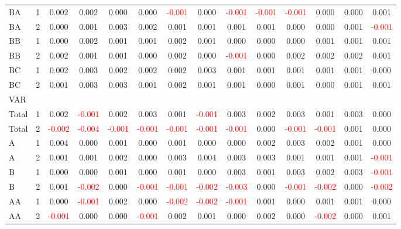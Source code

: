 \begin{table}[H]
{\begin{tabular}{llcccccccccccc}
BA & 1 & 0.002 & 0.002 & 0.000 & 0.000 & \textcolor{red}{-0.001} & 0.000 & \textcolor{red}{-0.001} & \textcolor{red}{-0.001} & \textcolor{red}{-0.001} & 0.000 & 0.000 & 0.001\\
BA & 2 & 0.000 & 0.001 & 0.003 & 0.002 & 0.001 & 0.001 & 0.001 & 0.001 & 0.000 & 0.000 & 0.001 & \textcolor{red}{-0.001}\\
BB & 1 & 0.000 & 0.002 & 0.001 & 0.001 & 0.002 & 0.001 & 0.000 & 0.000 & 0.000 & 0.001 & 0.001 & 0.001\\
BB & 2 & 0.002 & 0.001 & 0.001 & 0.000 & 0.002 & 0.000 & \textcolor{red}{-0.001} & 0.000 & 0.002 & 0.002 & 0.002 & 0.001\\
BC & 1 & 0.002 & 0.003 & 0.002 & 0.002 & 0.002 & 0.003 & 0.001 & 0.001 & 0.001 & 0.001 & 0.001 & 0.000\\
BC & 2 & 0.001 & 0.003 & 0.003 & 0.001 & 0.002 & 0.001 & 0.001 & 0.000 & 0.001 & 0.000 & 0.001 & 0.001\\
\hline
VAR &  &  &  &  &  &  &  &  &  &  &  &  & \\
\hline
Total & 1 & 0.002 & \textcolor{red}{-0.001} & 0.002 & 0.003 & 0.001 & \textcolor{red}{-0.001} & 0.003 & 0.002 & 0.003 & 0.001 & 0.003 & 0.000\\
Total & 2 & \textcolor{red}{-0.002} & \textcolor{red}{-0.004} & \textcolor{red}{-0.001} & \textcolor{red}{-0.001} & \textcolor{red}{-0.001} & \textcolor{red}{-0.001} & \textcolor{red}{-0.001} & 0.000 & \textcolor{red}{-0.001} & \textcolor{red}{-0.001} & 0.001 & 0.000\\
A & 1 & 0.004 & 0.000 & 0.001 & 0.000 & 0.001 & 0.000 & 0.000 & 0.002 & 0.003 & 0.002 & 0.001 & 0.000\\
A & 2 & 0.001 & 0.001 & 0.002 & 0.000 & 0.003 & 0.004 & 0.003 & 0.003 & 0.001 & 0.001 & 0.001 & \textcolor{red}{-0.001}\\
B & 1 & 0.000 & 0.000 & 0.001 & 0.000 & 0.001 & 0.000 & 0.003 & 0.001 & 0.003 & 0.002 & 0.003 & \textcolor{red}{-0.001}\\
B & 2 & 0.001 & \textcolor{red}{-0.002} & 0.000 & \textcolor{red}{-0.001} & \textcolor{red}{-0.001} & \textcolor{red}{-0.002} & \textcolor{red}{-0.003} & 0.000 & \textcolor{red}{-0.001} & \textcolor{red}{-0.002} & 0.000 & \textcolor{red}{-0.002}\\
AA & 1 & 0.000 & \textcolor{red}{-0.001} & 0.002 & 0.000 & \textcolor{red}{-0.002} & \textcolor{red}{-0.002} & \textcolor{red}{-0.001} & 0.001 & 0.000 & 0.001 & 0.001 & 0.000\\
AA & 2 & \textcolor{red}{-0.001} & 0.000 & 0.000 & \textcolor{red}{-0.001} & 0.002 & 0.001 & 0.000 & 0.002 & 0.000 & \textcolor{red}{-0.002} & 0.000 & 0.001\\

\end{tabular}}
\end{table}
